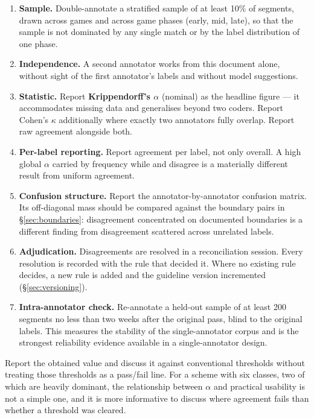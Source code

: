 \begin{enumerate}
  \item \textbf{Sample.} Double-annotate a stratified sample of at least 10\% of segments, drawn across games and across game phases (early, mid, late), so that the sample is not dominated by any single match or by the label distribution of one phase.
  \item \textbf{Independence.} A second annotator works from this document alone, without sight of the first annotator's labels and without model suggestions.
  \item \textbf{Statistic.} Report \textbf{Krippendorff's $\alpha$} (nominal) as the headline figure --- it accommodates missing data and generalises beyond two coders. Report Cohen's $\kappa$ additionally where exactly two annotators fully overlap. Report raw agreement alongside both.
  \item \textbf{Per-label reporting.} Report agreement per label, not only overall. A high global $\alpha$ carried by \PBP{} frequency while \HYP{} and \STO{} disagree is a materially different result from uniform agreement.
  \item \textbf{Confusion structure.} Report the annotator-by-annotator confusion matrix. Its off-diagonal mass should be compared against the boundary pairs in \S\ref{sec:boundaries}: disagreement concentrated on documented boundaries is a different finding from disagreement scattered across unrelated labels.
  \item \textbf{Adjudication.} Disagreements are resolved in a reconciliation session. Every resolution is recorded with the rule that decided it. Where no existing rule decides, a new rule is added and the guideline version incremented (\S\ref{sec:versioning}).
  \item \textbf{Intra-annotator check.} Re-annotate a held-out sample of at least 200 segments no less than two weeks after the original pass, blind to the original labels. This measures the stability of the single-annotator corpus and is the strongest reliability evidence available in a single-annotator design.
\end{enumerate}

\begin{agrulebox}
Report the obtained value and discuss it against conventional thresholds without treating those thresholds as a pass/fail line. For a scheme with six classes, two of which are heavily dominant, the relationship between $\alpha$ and practical usability is not a simple one, and it is more informative to discuss where agreement fails than whether a threshold was cleared.
\end{agrulebox}

